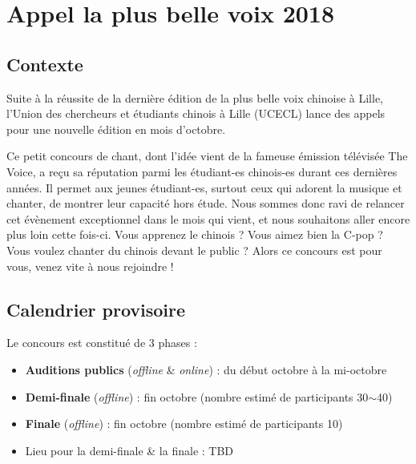 \documentclass[11pt,fleqn]{book} %
\begin{document}



\chapter*{Appel la plus belle voix 2018}

\section{Contexte}

Suite \`a la r\'eussite de la derni\`ere \'edition de la plus belle voix chinoise \`a Lille, l'Union des chercheurs et \'etudiants chinois \`a Lille (UCECL) lance des appels pour une nouvelle \'edition en mois d'octobre.

Ce petit concours de chant, dont l'id\'ee vient de la fameuse \'emission t\'el\'evis\'ee The Voice, a re\c cu sa r\'eputation parmi les \'etudiant-es chinois-es durant ces derni\`eres ann\'ees. Il permet aux jeunes \'etudiant-es, surtout ceux qui adorent la musique et chanter, de montrer leur capacit\'e hors \'etude. Nous sommes donc ravi de relancer cet \'ev\`enement exceptionnel dans le mois qui vient, et nous souhaitons aller encore plus loin cette fois-ci. Vous apprenez le chinois ? Vous aimez bien la C-pop ? Vous voulez chanter du chinois devant le public ? Alors ce concours est pour vous, venez vite \`a nous rejoindre !

\section{Calendrier provisoire}

Le concours est constitu\'e de 3 phases :

\begin{itemize}
    \item[\Checkmark] \textbf{Auditions publics} (\emph{offline} \& \emph{online}) : du d\'ebut octobre \`a la mi-octobre
    \item[\Checkmark] \textbf{Demi-finale} (\emph{offline}) : fin octobre (nombre estim\'e de participants 30$\sim$40)
    \item[\Checkmark] \textbf{Finale} (\emph{offline}) : fin octobre (nombre estim\'e de participants 10)
    \item[\Checkmark] Lieu pour la demi-finale \& la finale : TBD
\end{itemize}
\end{document}
